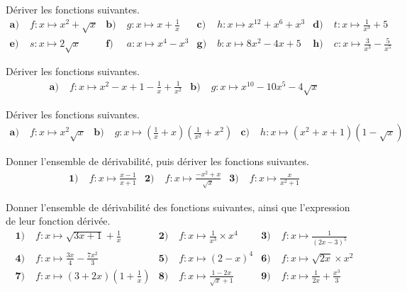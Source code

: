 \documentclass[11pt]{article}
\begin{document}
\begin{exo}
Dériver les fonctions suivantes.
\begin{align*}
  \textbf{a)}\;& f:x\mapsto x^2+\sqrt x &
  \textbf{b)}\;& g:x\mapsto x+\frac{1}{x} &
  \textbf{c)}\;& h:x\mapsto x^{12}+x^{6}+x^3 &
  \textbf{d)}\;& t:x\mapsto \frac{1}{x^3} + 5 \\
  \textbf{e)}\;& s:x\mapsto 2\sqrt x &
  \textbf{f)}\;& a:x\mapsto x^4-x^3 &
  \textbf{g)}\;& b:x\mapsto 8x^2-4x+5 &
  \textbf{h)}\;& c:x\mapsto \frac{3}{x^3} - \frac{5}{x^5}
\end{align*}
\end{exo}

\begin{exo}
Dériver les fonctions suivantes.
\begin{align*}
  \textbf{a)}\;& f:x\mapsto x^2-x+1-\frac{1}{x}+\frac{1}{x^2} &
  \textbf{b)}\;& g:x\mapsto x^{10}-10x^5-4\sqrt x
\end{align*}
\end{exo}

\begin{exo}
Dériver les fonctions suivantes.
\begin{align*}
  \textbf{a)}\;& f:x\mapsto x^2\sqrt{x} &
  \textbf{b)}\;& g:x\mapsto
  \left(\frac{1}{x}+x\right)\left(\frac{1}{x^2}+x^2\right) &
  \textbf{c)}\;& h:x\mapsto (x^2+x+1)(1-\sqrt{x})
\end{align*}
\end{exo}

\begin{exo}
Donner l'ensemble de dérivabilité, puis dériver les fonctions suivantes.
\begin{align*}
  \textbf{1)}\; & f:x\mapsto\frac{x-1}{x+1} &
  \textbf{2)}\; & f:x\mapsto\frac{-x^2+x}{\sqrt x} &
  \textbf{3)}\; & f:x\mapsto\frac{x}{x^2+1}
\end{align*}
\end{exo}

\begin{exo}
Donner l'ensemble de dérivabilité des fonctions
suivantes, ainsi que l'expression de leur fonction dérivée.
\begin{align*}
  \textbf{1)}\; & f:x\mapsto \sqrt{3x+1}+\frac{1}{x} &
  \textbf{2)}\; & f:x\mapsto \frac{1}{x^3}\times x^4 &
  \textbf{3)}\; & f:x\mapsto \frac{1}{(2x-3)^5} \\
  \textbf{4)}\; & f:x\mapsto \frac{3x}{4}-\frac{7x^2}{3} &
  \textbf{5)}\; & f:x\mapsto (2-x)^4 &
  \textbf{6)}\; & f:x\mapsto \sqrt{2x}\times x^2 \\
  \textbf{7)}\; & f:x\mapsto (3+2x)\left(1+\frac{1}{x}\right) &
  \textbf{8)}\; & f:x\mapsto \frac{1-2x}{\sqrt x+1} &
  \textbf{9)}\; & f:x\mapsto \frac{1}{2x}+\frac{x^3}{3}
\end{align*}
\end{exo}
\end{document}
